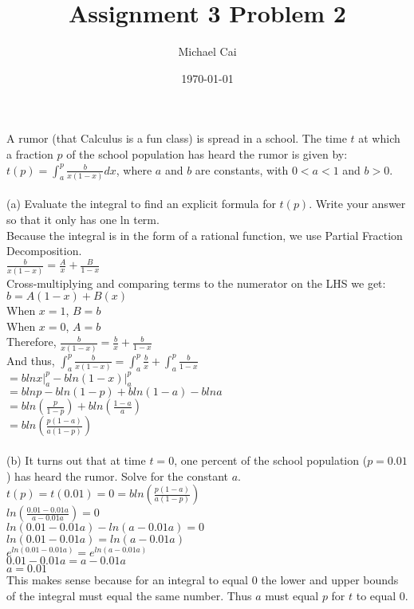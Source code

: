 \documentclass[11pt, oneside]{article}   	%
\title{Assignment 3 Problem 2}
\author{Michael Cai}
\date{\today}							%
\begin{document}
\maketitle
\noindent A rumor (that Calculus is a fun class) is spread in a school. The time $t$ at which a fraction $p$ of the school population has heard the rumor is given by: $t(p) = \int_a^p \frac{b}{x(1-x)}dx$, where $a$ and $b$ are constants, with $0<a<1$ and $b>0$. \\~\\
(a) Evaluate the integral to find an explicit formula for $t(p)$. Write your answer so that it only has one ln term.\\
Because the integral is in the form of a rational function, we use Partial Fraction Decomposition.\\
$\frac{b}{x(1-x)} = \frac{A}{x} + \frac{B}{1-x}$\\
Cross-multiplying and comparing terms to the numerator on the LHS we get:\\
$b = A(1-x) + B(x)$\\
When $x=1$, $B=b$\\
When $x=0$, $A=b$\\
Therefore, $\frac{b}{x(1-x)} = \frac{b}{x} + \frac{b}{1-x}$\\
And thus, $\int_a^p \frac{b}{x(1-x)} = \int_a^p \frac{b}{x} + \int_a^p \frac{b}{1-x}$\\
$= \left. blnx \right|_a^p - \left. bln(1-x) \right|_a^p$\\
$= blnp - bln(1-p) + bln(1-a) - blna$\\
$= bln(\frac{p}{1-p}) + bln(\frac{1-a}{a})$\\
$= bln(\frac{p(1-a)}{a(1-p)})$\\~\\
(b) It turns out that at time $t=0$, one percent of the school population ($p=0.01$) has heard the rumor. Solve for the constant $a$. \\
$t(p) = t(0.01) = 0 = bln(\frac{p(1-a)}{a(1-p)})$\\
$ln(\frac{0.01 - 0.01a}{a - 0.01a}) = 0$\\
$ln(0.01 - 0.01a)-ln(a-0.01a) = 0$\\
$ln(0.01 - 0.01a) = ln(a-0.01a)$\\
$e^{ln(0.01 - 0.01a)} = e^{ln(a-0.01a)}$\\
$0.01 - 0.01 a = a - 0.01a$\\
$a = 0.01$\\
This makes sense because for an integral to equal 0 the lower and upper bounds of the integral must equal the same number. Thus $a$ must equal $p$ for $t$ to equal 0.\\~\\
\end{document}
